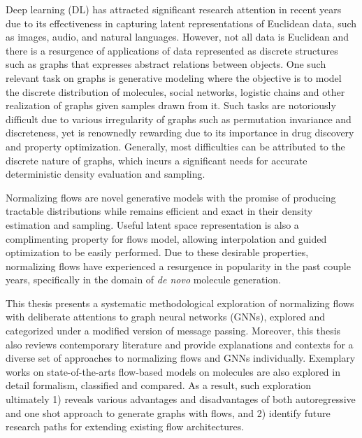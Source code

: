 \begin{spacing}{1.05}

	\vspace{.8mm}

  {\small Deep learning (DL) has attracted significant research attention in
  recent years due to its effectiveness in capturing latent representations of
  Euclidean data, such as images, audio, and natural languages. However, not all
  data is Euclidean and there is a resurgence of applications of data
  represented as discrete structures such as graphs that expresses abstract
  relations between objects. One such relevant task on graphs is generative
  modeling where the objective is to model the discrete distribution of
  molecules, social networks, logistic chains and other realization of graphs
  given samples drawn from it. Such tasks are notoriously difficult due to
  various irregularity of graphs such as permutation invariance and
  discreteness, yet is renownedly rewarding due to its importance in drug
  discovery and property optimization. Generally, most difficulties can be
  attributed to the discrete nature of graphs, which incurs a significant needs
  for accurate deterministic density evaluation and sampling.

  Normalizing flows are novel generative models with the promise of producing
  tractable distributions while remains efficient and exact in their density
  estimation and sampling. Useful latent space representation is also a
  complimenting property for flows model, allowing interpolation and guided
  optimization to be easily performed. Due to these desirable properties,
  normalizing flows have experienced a resurgence in popularity in the past
  couple years, specifically in the domain of \textit{de novo} molecule
  generation.

  This thesis presents a systematic methodological exploration of normalizing
  flows with deliberate attentions to graph neural networks (GNNs), explored and
  categorized under a modified version of message passing. Moreover, this thesis
  also reviews contemporary literature and provide explanations and contexts for
  a diverse set of approaches to normalizing flows and GNNs individually.
  Exemplary works on state-of-the-arts flow-based models on molecules
  are also explored in detail formalism, classified and compared. As a result,
  such exploration ultimately 1) reveals various advantages and disadvantages of
  both autoregressive and one shot approach to generate graphs with flows, and
  2) identify future research paths for extending existing flow architectures.
	}

	\vfill

\end{spacing}
